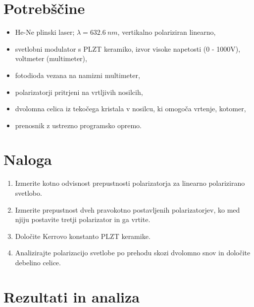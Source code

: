 \documentclass[12pt]{article}
\begin{document}
\section{Potrebščine}

\begin{itemize}
    \item He-Ne plinski laser; $\lambda = 632.6\ nm$, vertikalno polariziran linearno,
    \item svetlobni modulator s PLZT keramiko, izvor visoke napetosti (0 - 1000V), voltmeter (multimeter),
    \item fotodioda vezana na namizni multimeter,
    \item polarizatorji pritrjeni na vrtljivih nosilcih,
    \item dvolomna celica iz tekočega kristala v nosilcu, ki omogoča vrtenje, kotomer,
    \item prenosnik z ustrezno programsko opremo.
\end{itemize}

\section{Naloga}
\begin{enumerate}
    \item Izmerite kotno odvisnost prepustnosti polarizatorja za linearno polarizirano svetlobo.
    \item Izmerite prepustnost dveh pravokotno postavljenih polarizatorjev, ko med njiju postavite tretji polarizator in ga vrtite.
    \item Določite Kerrovo konstanto PLZT keramike.
    \item Analizirajte polarizacijo svetlobe po prehodu skozi dvolomno snov in določite debelino celice.
\end{enumerate}


\section{Rezultati in analiza}
\end{document}

